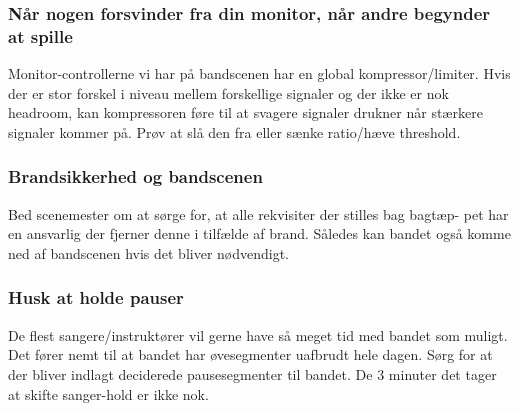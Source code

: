 \subsubsection{Når nogen forsvinder fra din monitor, når andre begynder at spille}
Monitor-controllerne vi har på bandscenen har en global kompressor/limiter. Hvis der er stor forskel i niveau mellem forskellige signaler og der ikke er nok headroom, kan kompressoren føre til at svagere signaler drukner når stærkere signaler kommer på. Prøv at slå den fra eller sænke ratio/hæve threshold. 

\subsubsection{Brandsikkerhed og bandscenen}
Bed scenemester om at sørge for, at alle rekvisiter der stilles bag bagtæp-
pet har en ansvarlig der fjerner denne i tilfælde af brand. Således kan
bandet også komme ned af bandscenen hvis det bliver nødvendigt.

\subsubsection{Husk at holde pauser}
De flest sangere/instruktører vil gerne have så meget tid med bandet som muligt. Det fører nemt til at bandet har øvesegmenter uafbrudt hele dagen. Sørg for at der bliver indlagt deciderede pausesegmenter til bandet. De 3 minuter det tager at skifte sanger-hold er ikke nok.
